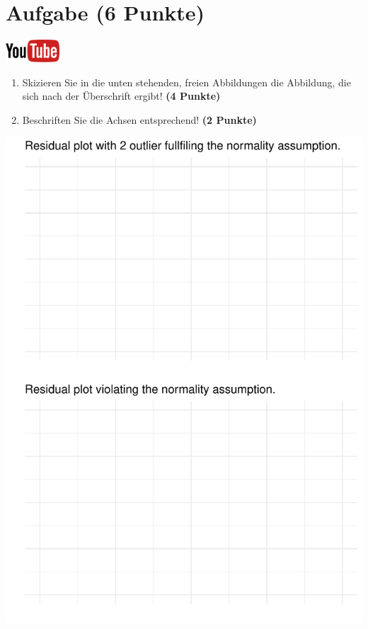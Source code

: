 \documentclass[a4paper, 10pt]{scrartcl}\usepackage[]{graphicx}\usepackage[]{xcolor}
\makeatletter
\def\maxwidth{ %
  \ifdim\Gin@nat@width>\linewidth
    \linewidth
  \else
    \Gin@nat@width
  \fi
}
\makeatother
\begin{document}
\section{Aufgabe \hfill (6 Punkte)}

\hfill\href{https://youtu.be/EK7JEtdZbnw}{\includegraphics[width =
  2cm]{img/youtube}}\\[1Ex]




\begin{enumerate}
\item Skizieren Sie in die unten stehenden, freien Abbildungen die
  Abbildung, die sich nach der {\"U}berschrift ergibt! \textbf{(4 Punkte)}
\item Beschriften Sie die Achsen entsprechend! \textbf{(2 Punkte)}
\end{enumerate}



{\centering \includegraphics[width=\maxwidth]{img/regression-03-1} 

}
\end{document}
